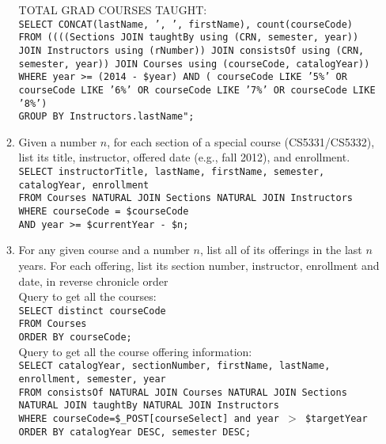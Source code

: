 \begin{enumerate}
\begin{enumerate}
					 TOTAL GRAD COURSES TAUGHT:\\
					\texttt{SELECT CONCAT(lastName, ', ', firstName), count(courseCode)\\
						FROM ((((Sections JOIN taughtBy using (CRN, semester, year)) JOIN Instructors using (rNumber)) JOIN consistsOf using (CRN, semester, year)) JOIN Courses using (courseCode, catalogYear))\\
						WHERE year >= (2014 - \$year) AND ( courseCode LIKE '5\%' OR courseCode LIKE '6\%' OR courseCode LIKE '7\%' OR courseCode LIKE '8\%')\\
						GROUP BY Instructors.lastName";}\\
							
							
			
			\item 	 Given a number $n$, for each section of a special course (CS5331/CS5332), list its title, instructor, offered date (e.g., fall 2012), and enrollment.\\

					\texttt{SELECT instructorTitle, lastName, firstName, semester, catalogYear, enrollment\\
							FROM Courses NATURAL JOIN Sections NATURAL JOIN Instructors\\
							WHERE courseCode = \$courseCode\\
							AND year >= \$currentYear - \$n;}\\
							
							
			\item 	For any given course and a number $n$, list all of its offerings in the last $n$ years. For each offering, list its section number, instructor, enrollment and date, in reverse chronicle order\\
	
					Query to get all the courses:\\
					\texttt{SELECT distinct courseCode\\
							FROM Courses\\
							ORDER BY courseCode;}\\

					Query to get all the course offering information:\\
					\texttt{SELECT catalogYear, sectionNumber, firstName, lastName, enrollment, semester, year\\
							FROM consistsOf NATURAL JOIN Courses NATURAL JOIN Sections NATURAL JOIN taughtBy NATURAL JOIN Instructors\\
							WHERE courseCode=\$\_POST[courseSelect] and year $>$ \$targetYear\\
							ORDER BY catalogYear DESC, semester DESC;}\\
							

\end{enumerate}
\end{enumerate}
